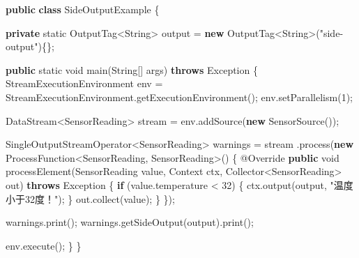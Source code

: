 \documentclass[cn,11pt,chinese]{elegantbook}
\newenvironment{Shaded}{}{}
\newcommand{\AttributeTok}[1]{\textcolor[rgb]{0.49,0.56,0.16}{#1}}
\newcommand{\BuiltInTok}[1]{#1}
\newcommand{\DataTypeTok}[1]{\textcolor[rgb]{0.56,0.13,0.00}{#1}}
\newcommand{\DecValTok}[1]{\textcolor[rgb]{0.25,0.63,0.44}{#1}}
\newcommand{\FunctionTok}[1]{\textcolor[rgb]{0.02,0.16,0.49}{#1}}
\newcommand{\KeywordTok}[1]{\textcolor[rgb]{0.00,0.44,0.13}{\textbf{#1}}}
\newcommand{\NormalTok}[1]{#1}
\newcommand{\StringTok}[1]{\textcolor[rgb]{0.25,0.44,0.63}{#1}}
\begin{document}
\begin{Shaded}
\begin{Highlighting}[]
\KeywordTok{public} \KeywordTok{class}\NormalTok{ SideOutputExample \{}

    \KeywordTok{private} \DataTypeTok{static}\NormalTok{ OutputTag\textless{}}\BuiltInTok{String}\NormalTok{\textgreater{} output = }\KeywordTok{new}\NormalTok{ OutputTag\textless{}}\BuiltInTok{String}\NormalTok{\textgreater{}(}\StringTok{"side{-}output"}\NormalTok{)\{\};}

    \KeywordTok{public} \DataTypeTok{static} \DataTypeTok{void} \FunctionTok{main}\NormalTok{(}\BuiltInTok{String}\NormalTok{[] args) }\KeywordTok{throws} \BuiltInTok{Exception}\NormalTok{ \{}
\NormalTok{        StreamExecutionEnvironment env = StreamExecutionEnvironment.}\FunctionTok{getExecutionEnvironment}\NormalTok{();}
\NormalTok{        env.}\FunctionTok{setParallelism}\NormalTok{(}\DecValTok{1}\NormalTok{);}

\NormalTok{        DataStream\textless{}SensorReading\textgreater{} stream = env.}\FunctionTok{addSource}\NormalTok{(}\KeywordTok{new} \FunctionTok{SensorSource}\NormalTok{());}

\NormalTok{        SingleOutputStreamOperator\textless{}SensorReading\textgreater{} warnings = stream}
\NormalTok{                .}\FunctionTok{process}\NormalTok{(}\KeywordTok{new}\NormalTok{ ProcessFunction\textless{}SensorReading, SensorReading\textgreater{}() \{}
                    \AttributeTok{@Override}
                    \KeywordTok{public} \DataTypeTok{void} \FunctionTok{processElement}\NormalTok{(SensorReading value, }\BuiltInTok{Context}\NormalTok{ ctx, Collector\textless{}SensorReading\textgreater{} out) }\KeywordTok{throws} \BuiltInTok{Exception}\NormalTok{ \{}
                        \KeywordTok{if}\NormalTok{ (value.}\FunctionTok{temperature}\NormalTok{ \textless{} }\DecValTok{32}\NormalTok{) \{}
\NormalTok{                            ctx.}\FunctionTok{output}\NormalTok{(output, }\StringTok{"温度小于32度！"}\NormalTok{);}
\NormalTok{                        \}}
\NormalTok{                        out.}\FunctionTok{collect}\NormalTok{(value);}
\NormalTok{                    \}}
\NormalTok{                \});}

\NormalTok{        warnings.}\FunctionTok{print}\NormalTok{();}
\NormalTok{        warnings.}\FunctionTok{getSideOutput}\NormalTok{(output).}\FunctionTok{print}\NormalTok{();}

\NormalTok{        env.}\FunctionTok{execute}\NormalTok{();}
\NormalTok{    \}}
\NormalTok{\}}
\end{Highlighting}
\end{Shaded}
\end{document}
